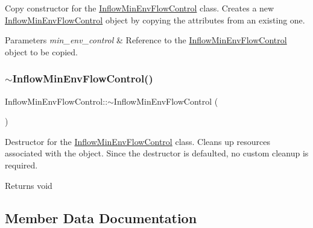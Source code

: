 Copy constructor for the {\ttfamily \mbox{\hyperlink{classInflowMinEnvFlowControl}{Inflow\+Min\+Env\+Flow\+Control}}} class. Creates a new {\ttfamily \mbox{\hyperlink{classInflowMinEnvFlowControl}{Inflow\+Min\+Env\+Flow\+Control}}} object by copying the attributes from an existing one. 


\begin{DoxyParams}{Parameters}
{\em min\+\_\+env\+\_\+control} & Reference to the {\ttfamily \mbox{\hyperlink{classInflowMinEnvFlowControl}{Inflow\+Min\+Env\+Flow\+Control}}} object to be copied. \\
\hline
\end{DoxyParams}
\mbox{\label{classInflowMinEnvFlowControl_af96a86078cd257309ed55f0cd9ed032e}} 
\subsubsection{\texorpdfstring{$\sim$\+Inflow\+Min\+Env\+Flow\+Control()}{~InflowMinEnvFlowControl()}}
{\footnotesize\ttfamily Inflow\+Min\+Env\+Flow\+Control\+::$\sim$\+Inflow\+Min\+Env\+Flow\+Control (\begin{DoxyParamCaption}{ }\end{DoxyParamCaption})\hspace{0.3cm}{\ttfamily [override]}}



Destructor for the {\ttfamily \mbox{\hyperlink{classInflowMinEnvFlowControl}{Inflow\+Min\+Env\+Flow\+Control}}} class. Cleans up resources associated with the object. Since the destructor is defaulted, no custom cleanup is required. 

\begin{DoxyReturn}{Returns}
void 
\end{DoxyReturn}


\subsection{Member Data Documentation}
\mbox{\label{classInflowMinEnvFlowControl_a669660259afa9313c77094dec815a52f}} 
